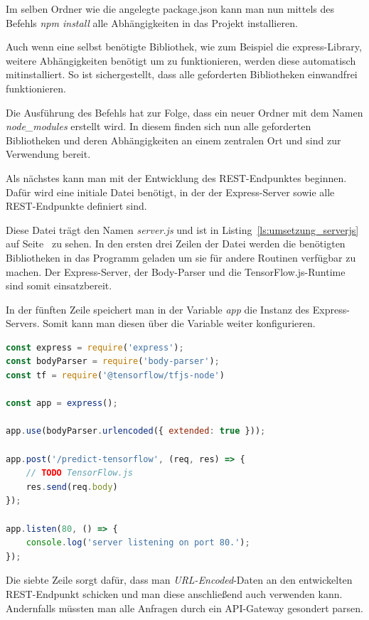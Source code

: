 Im selben Ordner wie die angelegte package.json kann man nun mittels des Befehls \textit{npm install} alle
Abhängigkeiten in das Projekt installieren.

Auch wenn eine selbst benötigte Bibliothek, wie zum Beispiel die express-Library, weitere Abhängigkeiten benötigt um zu
funktionieren, werden diese automatisch mitinstalliert. So ist sichergestellt, dass alle geforderten Bibliotheken
einwandfrei funktionieren.

Die Ausführung des Befehls hat zur Folge, dass ein neuer Ordner mit dem Namen \textit{node\_modules} erstellt wird. In
diesem finden sich nun alle geforderten Bibliotheken und deren Abhängigkeiten an einem zentralen Ort und sind zur
Verwendung bereit.

Als nächstes kann man mit der Entwicklung des REST-Endpunktes beginnen. Dafür wird eine initiale Datei benötigt, in der
der Express-Server sowie alle REST-Endpunkte definiert sind.

Diese Datei trägt den Namen \textit{server.js} und ist in Listing~\ref{ls:umsetzung_serverjs} auf 
Seite~\pageref{ls:umsetzung_serverjs} zu sehen. In den ersten drei Zeilen der Datei werden die benötigten Bibliotheken
in das Programm geladen um sie für andere Routinen verfügbar zu machen. Der Express-Server, der Body-Parser und die
TensorFlow.js-Runtime sind somit einsatzbereit.

In der fünften Zeile speichert man in der Variable \textit{app} die Instanz des Express-Servers. Somit kann man diesen
über die Variable weiter konfigurieren.

\begin{lstlisting}[language=JavaScript, caption=Die komplette server.js, label=ls:umsetzung_serverjs]
const express = require('express');
const bodyParser = require('body-parser');
const tf = require('@tensorflow/tfjs-node')

const app = express();

app.use(bodyParser.urlencoded({ extended: true }));

app.post('/predict-tensorflow', (req, res) => {
    // TODO TensorFlow.js
    res.send(req.body)
});

app.listen(80, () => {
    console.log('server listening on port 80.');
});
\end{lstlisting}

Die siebte Zeile sorgt dafür, dass man \textit{URL-Encoded}-Daten an den entwickelten REST-Endpunkt schicken und man
diese anschließend auch verwenden kann. Andernfalls müssten man alle Anfragen durch ein API-Gateway gesondert parsen.

